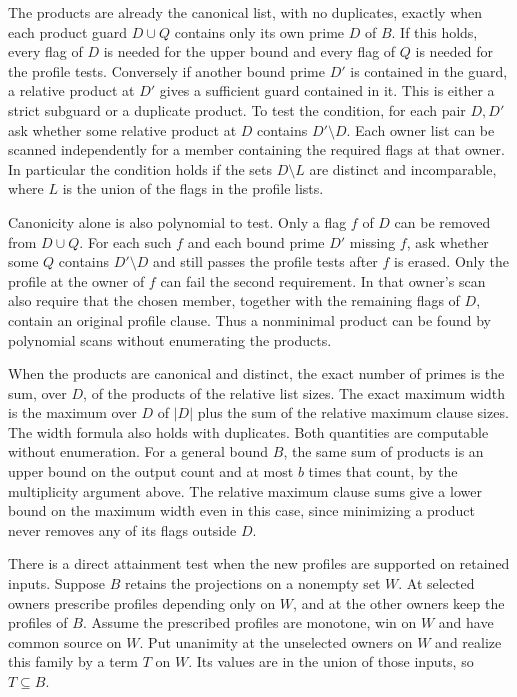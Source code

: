 The products are already the canonical list, with no
duplicates, exactly when each product guard $D\cup Q$
contains only its own prime $D$ of $B$. If this holds,
every flag of $D$ is needed for the upper bound and
every flag of $Q$ is needed for the profile tests.
Conversely if another bound prime $D'$ is contained
in the guard, a relative product at $D'$ gives a
sufficient guard contained in it. This is either a
strict subguard or a duplicate product. To test the
condition, for each pair $D,D'$ ask whether some
relative product at $D$ contains $D'\setminus D$.
Each owner list can be scanned independently for a
member containing the required flags at that owner.
In particular the condition holds if the sets
$D\setminus L$ are distinct and incomparable, where
$L$ is the union of the flags in the profile lists.

Canonicity alone is also polynomial to test. Only a
flag $f$ of $D$ can be removed from $D\cup Q$. For
each such $f$ and each bound prime $D'$ missing $f$,
ask whether some $Q$ contains $D'\setminus D$ and
still passes the profile tests after $f$ is erased.
Only the profile at the owner of $f$ can fail the
second requirement. In that owner's scan also require
that the chosen member, together with the remaining
flags of $D$, contain an original profile clause.
Thus a nonminimal product can be found by polynomial
scans without enumerating the products.

When the products are canonical and distinct, the exact number of primes is the sum,
over $D$, of the products of the relative list sizes.
The exact maximum width is the maximum over $D$ of
$|D|$ plus the sum of the relative maximum clause
sizes. The width formula also holds with duplicates.
Both quantities are computable without enumeration.
For a general bound $B$, the same sum
of products is an upper bound on the output count and
at most $b$ times that count, by the multiplicity
argument above. The relative maximum clause sums
give a lower bound on the maximum width even in
this case, since minimizing a product never removes
any of its flags outside $D$.

There is a direct attainment test when the new profiles
are supported on retained inputs. Suppose $B$ retains
the projections on a nonempty set $W$. At selected
owners prescribe profiles depending only on $W$, and
at the other owners keep the profiles of $B$. Assume
the prescribed profiles are monotone, win on $W$ and
have common source on $W$. Put unanimity at the
unselected owners on $W$ and realize this family by
a term $T$ on $W$. Its values are in the union of
those inputs, so $T\subseteq B$.

